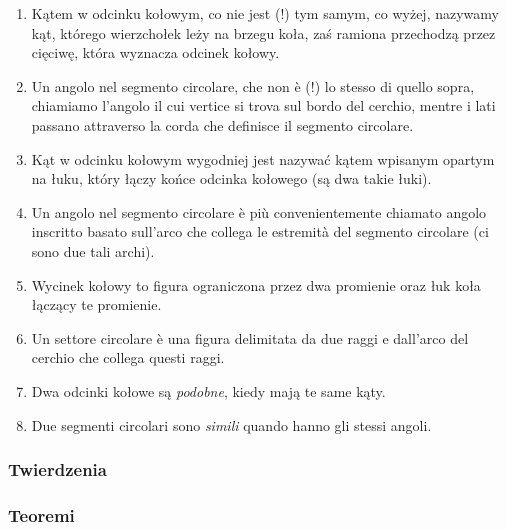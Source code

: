 \begin{enumerate}
    \item [3.8] Kątem w odcinku kołowym, co nie jest (!) tym samym, co wyżej, nazywamy kąt, którego wierzchołek leży na brzegu koła, zaś ramiona przechodzą przez cięciwę, która wyznacza odcinek kołowy. %
    \item [3.8] Un angolo nel segmento circolare, che non è (!) lo stesso di quello sopra, chiamiamo l'angolo il cui vertice si trova sul bordo del cerchio, mentre i lati passano attraverso la corda che definisce il segmento circolare. %

    \item [3.9] Kąt w odcinku kołowym wygodniej jest nazywać kątem wpisanym opartym na łuku, który łączy końce odcinka kołowego (są dwa takie łuki). %
    \item [3.9] Un angolo nel segmento circolare è più convenientemente chiamato angolo inscritto basato sull'arco che collega le estremità del segmento circolare (ci sono due tali archi). %

    \item [3.10] Wycinek kołowy to figura ograniczona przez dwa promienie oraz łuk koła łączący te promienie. %
    \item [3.10] Un settore circolare è una figura delimitata da due raggi e dall'arco del cerchio che collega questi raggi. %

    \item [3.11] Dwa odcinki kołowe są \emph{podobne}, kiedy mają te same kąty. %
    \item [3.11] Due segmenti circolari sono \emph{simili} quando hanno gli stessi angoli. %
\end{enumerate}

\subsubsection{Twierdzenia} %
\subsubsection{Teoremi} %

